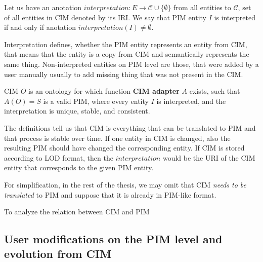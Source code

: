 
\smallskip

\begin{definition}[interpretation]
    Let us have an anotation $interpretation: E \rightarrow \mathcal{C} \cup \{\emptyset\}$ from all entities to $\mathcal{C}$, set of all entities in CIM denoted by its IRI. We say that PIM entity $I$ is interpreted if and only if anotation $interpretation(I) \neq \emptyset$.
\end{definition}

Interpretation defines, whether the PIM entity represents an entity from CIM, that means that the entity is a copy from CIM and semantically represents the same thing. Non-interpreted entities on PIM level are those, that were added by a user manually usually to add missing thing that was not present in the CIM.

\smallskip

\begin{definition}[CIM]
    CIM $O$ is an ontology for which function \textbf{CIM adapter} $A$ exists, such that $A(O) = S$ is a valid PIM, where every entity $I$ is interpreted, and the interpretation is unique, stable, and consistent.
\end{definition}

The definitions tell us that CIM is everything that can be translated to PIM and that process is stable over time. If one entity in CIM is changed, also the resulting PIM should have changed the corresponding entity. If CIM is stored according to LOD format, then the $interpretation$ would be the URI of the CIM entity that corresponds to the given PIM entity.

For simplification, in the rest of the thesis, we may omit that CIM \textit{needs to be translated} to PIM and suppose that it is already in PIM-like format.

\bigskip

To analyze the relation between CIM and PIM







\newpage\subsection{User modifications on the PIM level and evolution from CIM}


